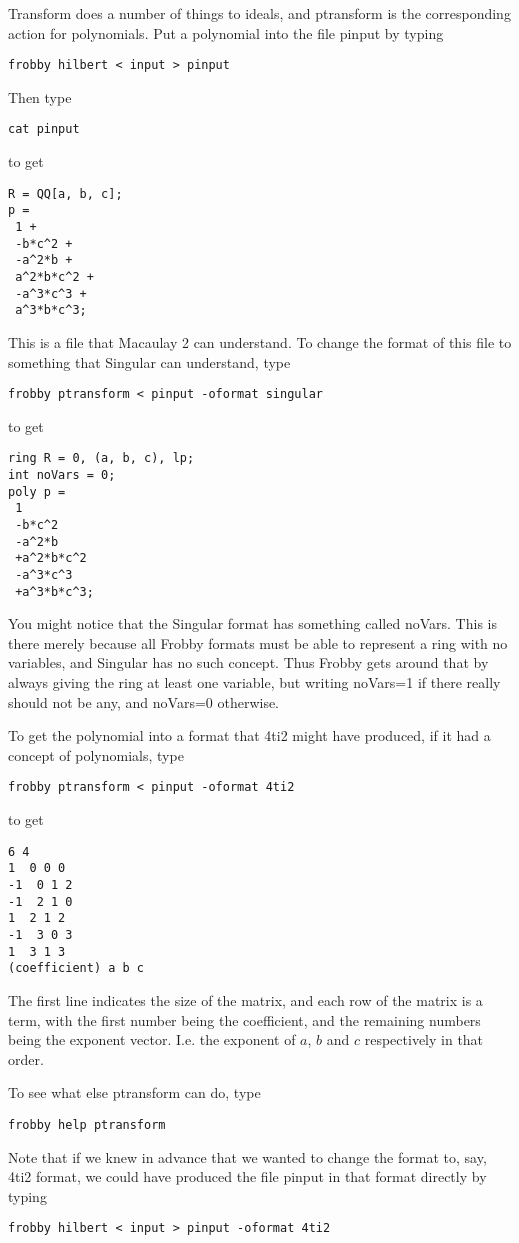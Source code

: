 \documentclass{amsart}
\theoremstyle{definition}
\begin{document}
Transform does a number of things to ideals, and ptransform is the
corresponding action for polynomials. Put a polynomial into the file
pinput by typing
\begin{verbatim}
frobby hilbert < input > pinput
\end{verbatim}
Then type
\begin{verbatim}
cat pinput
\end{verbatim}
to get
\begin{verbatim}
R = QQ[a, b, c];
p =
 1 +
 -b*c^2 +
 -a^2*b +
 a^2*b*c^2 +
 -a^3*c^3 +
 a^3*b*c^3;
\end{verbatim}
This is a file that Macaulay 2 can understand. To change the format of
this file to something that Singular can understand, type
\begin{verbatim}
frobby ptransform < pinput -oformat singular
\end{verbatim}
to get
\begin{verbatim}
ring R = 0, (a, b, c), lp;
int noVars = 0;
poly p =
 1
 -b*c^2
 -a^2*b
 +a^2*b*c^2
 -a^3*c^3
 +a^3*b*c^3;
\end{verbatim}
You might notice that the Singular format has something called
noVars. This is there merely because all Frobby formats must be able
to represent a ring with no variables, and Singular has no such
concept. Thus Frobby gets around that by always giving the ring at
least one variable, but writing noVars=1 if there really should not be
any, and noVars=0 otherwise.

To get the polynomial into a format that 4ti2 might have produced, if
it had a concept of polynomials, type
\begin{verbatim}
frobby ptransform < pinput -oformat 4ti2
\end{verbatim}
to get
\begin{verbatim}
6 4
1  0 0 0
-1  0 1 2
-1  2 1 0
1  2 1 2
-1  3 0 3
1  3 1 3
(coefficient) a b c
\end{verbatim}
The first line indicates the size of the matrix, and each row of the
matrix is a term, with the first number being the coefficient, and the
remaining numbers being the exponent vector. I.e. the exponent of $a$,
$b$ and $c$ respectively in that order.

To see what else ptransform can do, type
\begin{verbatim}
frobby help ptransform
\end{verbatim}

Note that if we knew in advance that we wanted to change the format
to, say, 4ti2 format, we could have produced the file pinput in that
format directly by typing
\begin{verbatim}
frobby hilbert < input > pinput -oformat 4ti2
\end{verbatim}
\end{document}
